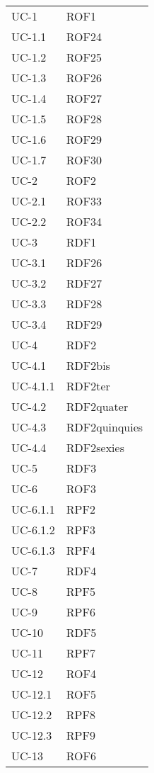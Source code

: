 \begin{longtable}{| p{5cm} | p{5cm} |}
		UC-1 & ROF1  \\
		\rowcolor{LightGray}
		UC-1.1 & ROF24 \\
		UC-1.2 & ROF25 \\
		\rowcolor{LightGray}
		UC-1.3 & ROF26 \\
		UC-1.4 & ROF27 \\
		\rowcolor{LightGray}
		UC-1.5 & ROF28 \\
		UC-1.6 & ROF29 \\
		\rowcolor{LightGray}
		UC-1.7 & ROF30 \\		
		UC-2 & ROF2 \\
		\rowcolor{LightGray}
		UC-2.1 & ROF33 \\
		UC-2.2 & ROF34 \\
		\rowcolor{LightGray}
		UC-3 & RDF1 \\
		UC-3.1 & RDF26 \\
		\rowcolor{LightGray}
		UC-3.2 & RDF27 \\
		UC-3.3 & RDF28 \\
		\rowcolor{LightGray}
		UC-3.4 & RDF29 \\
		UC-4 & RDF2 \\
		\rowcolor{LightGray}
		UC-4.1 & RDF2bis\\
		UC-4.1.1 & RDF2ter\\
		UC-4.2 & RDF2quater\\
		UC-4.3 & RDF2quinquies\\
		UC-4.4 & RDF2sexies\\
		\rowcolor{LightGray}
		UC-5 & RDF3 \\
		UC-6 & ROF3 \\
		\rowcolor{LightGray}
		UC-6.1.1 & RPF2 \\
		\rowcolor{LightGray}
		UC-6.1.2 & RPF3 \\
		UC-6.1.3 & RPF4 \\
		\rowcolor{LightGray}
		UC-7 & RDF4 \\
		UC-8 & RPF5 \\
		\rowcolor{LightGray}
		UC-9 & RPF6 \\
		UC-10 & RDF5 \\
		\rowcolor{LightGray}
		UC-11 & RPF7 \\
		UC-12 & ROF4 \\
		\rowcolor{LightGray}
		UC-12.1 & ROF5 \\
		UC-12.2 & RPF8 \\
		\rowcolor{LightGray}
		UC-12.3 & RPF9 \\
		UC-13 & ROF6 \\

\end{longtable}
